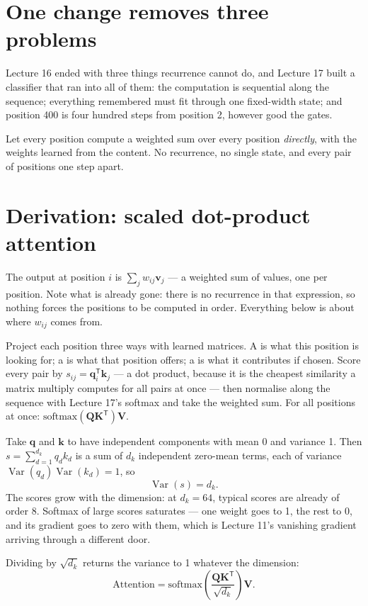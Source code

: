 \documentclass[11pt,a4paper]{article}
\begin{document}

\section{One change removes three problems}

Lecture 16 ended with three things recurrence cannot do, and Lecture 17 built a
classifier that ran into all of them: the computation is sequential along the
sequence; everything remembered must fit through one fixed-width state; and
position 400 is four hundred steps from position 2, however good the gates.

Let every position compute a weighted sum over every position \emph{directly},
with the weights learned from the content. No recurrence, no single state, and
every pair of positions one step apart.

\section{Derivation: scaled dot-product attention}

The output at position $i$ is $\sum_j w_{ij}\mathbf{v}_j$ --- a weighted sum of
values, one per position. Note what is already gone: there is no recurrence in
that expression, so nothing forces the positions to be computed in order.
Everything below is about where $w_{ij}$ comes from.

Project each position three ways with learned matrices. A  is what
this position is looking for; a  is what that position offers; a
 is what it contributes if chosen. Score every pair by
$s_{ij} = \mathbf{q}_i^{\mathsf T}\mathbf{k}_j$ --- a dot product, because it
is the cheapest similarity a matrix multiply computes for all pairs at once ---
then normalise along the sequence with Lecture 17's softmax and take the
weighted sum. For all positions at once:
$\mathrm{softmax}(\mathbf{Q}\mathbf{K}^{\mathsf T})\mathbf{V}$.

\begin{derivbox}[title={Why divide by $\sqrt{d_k}$}]
Take $\mathbf{q}$ and $\mathbf{k}$ to have independent components with mean 0
and variance 1. Then $s = \sum_{d=1}^{d_k} q_d k_d$ is a sum of $d_k$
independent zero-mean terms, each of variance
$\operatorname{Var}(q_d)\operatorname{Var}(k_d) = 1$, so
\[ \operatorname{Var}(s) = d_k. \]
The scores grow with the dimension: at $d_k = 64$, typical scores are already
of order 8. Softmax of large scores saturates --- one weight goes to 1, the
rest to 0, and its gradient goes to zero with them, which is Lecture 11's
vanishing gradient arriving through a different door.

Dividing by $\sqrt{d_k}$ returns the variance to 1 whatever the dimension:
\[ \mathrm{Attention}
   = \mathrm{softmax}\!\left(
     \frac{\mathbf{Q}\mathbf{K}^{\mathsf T}}{\sqrt{d_k}}\right)\mathbf{V}. \]
\end{derivbox}
\end{document}
